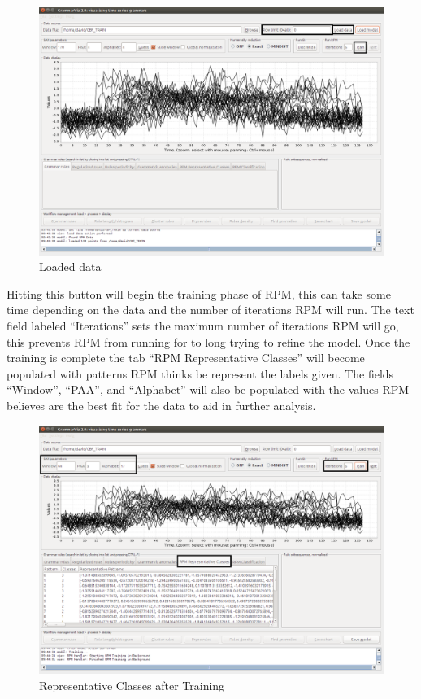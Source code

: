 \documentclass[letterpaper, 12pt]{article}
\begin{document}
\begin{figure}[H]
  \includegraphics[width=\textwidth]{grammarviz-training-step-4}
  \caption{Loaded data}
  \label{fig:grammarviz-training-step-4}
\end{figure}

\newpage
Hitting this button will begin the training phase of RPM, this can take some time depending on the data and the number of iterations RPM will run. The text field labeled ``Iterations'' sets the maximum number of iterations RPM will go, this prevents RPM from running for to long trying to refine the model. Once the training is complete the tab ``RPM Representative Classes'' will become populated with patterns RPM thinks be represent the labels given. The fields ``Window'', ``PAA'', and ``Alphabet'' will also be populated with the values RPM believes are the best fit for the data to aid in further analysis. 

\begin{figure}[H]
  \includegraphics[width=\textwidth]{grammarviz-training-step-5}
  \caption{Representative Classes after Training}
  \label{fig:grammarviz-training-step-5}
\end{figure}
\end{document}
